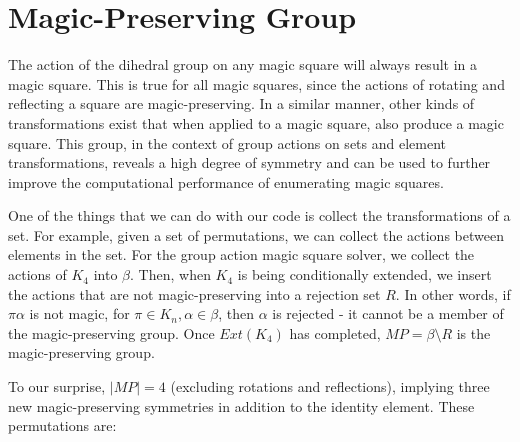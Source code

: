 \documentclass[12pt]{report}
\begin{document}
\newpage{}
\section{Magic-Preserving Group}

\par The action of the dihedral group on any magic square will always result in a magic square.
This is true for all magic squares, since the actions of rotating and reflecting a square are
magic-preserving. In a similar manner, other kinds of transformations exist that when applied to a
magic square, also produce a magic square. This group, in the context of group actions on sets and
element transformations, reveals a high degree of symmetry and can be used to further improve the
computational performance of enumerating magic squares.

\par One of the things that we can do with our code is collect the transformations of a set. For
example, given a set of permutations, we can collect the actions between elements in the set. For
the group action magic square solver, we collect the actions of $K_4$ into $\beta$. Then, when
$K_4$ is being conditionally extended, we insert the actions that are not magic-preserving into a
rejection set $R$. In other words, if $\pi\alpha$ is not magic, for $\pi \in K_n, \alpha \in
  \beta$, then $\alpha$ is rejected \hyphen{} it cannot be a member of the magic-preserving group.
Once $Ext\left(K_4\right)$ has completed, $MP= \beta \setminus R$ is the magic-preserving group.

\par To our surprise, $\left|MP\right|=4$ (excluding rotations and reflections), implying three new
magic-preserving symmetries in addition to the identity element. These permutations are:
\end{document}
